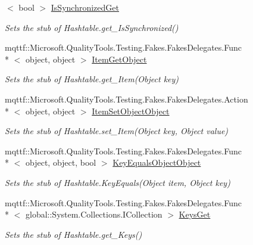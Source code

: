 \begin{DoxyCompactItemize}
$<$ bool $>$ \hyperlink{class_system_1_1_configuration_1_1_fakes_1_1_stub_settings_attribute_dictionary_a6901c41081a9838488c18b4675c11649}{Is\-Synchronized\-Get}
\begin{DoxyCompactList}\small\item\em Sets the stub of Hashtable.\-get\-\_\-\-Is\-Synchronized()\end{DoxyCompactList}\item 
mqttf\-::\-Microsoft.\-Quality\-Tools.\-Testing.\-Fakes.\-Fakes\-Delegates.\-Func\\*
$<$ object, object $>$ \hyperlink{class_system_1_1_configuration_1_1_fakes_1_1_stub_settings_attribute_dictionary_ad3d4d1179f9c27bd5b2f870a23fe1d64}{Item\-Get\-Object}
\begin{DoxyCompactList}\small\item\em Sets the stub of Hashtable.\-get\-\_\-\-Item(\-Object key)\end{DoxyCompactList}\item 
mqttf\-::\-Microsoft.\-Quality\-Tools.\-Testing.\-Fakes.\-Fakes\-Delegates.\-Action\\*
$<$ object, object $>$ \hyperlink{class_system_1_1_configuration_1_1_fakes_1_1_stub_settings_attribute_dictionary_a82cb99935a5c5d1f4e6e6943dd19197a}{Item\-Set\-Object\-Object}
\begin{DoxyCompactList}\small\item\em Sets the stub of Hashtable.\-set\-\_\-\-Item(\-Object key, Object value)\end{DoxyCompactList}\item 
mqttf\-::\-Microsoft.\-Quality\-Tools.\-Testing.\-Fakes.\-Fakes\-Delegates.\-Func\\*
$<$ object, object, bool $>$ \hyperlink{class_system_1_1_configuration_1_1_fakes_1_1_stub_settings_attribute_dictionary_af0339dc7fa0ffc87851718afcca750a7}{Key\-Equals\-Object\-Object}
\begin{DoxyCompactList}\small\item\em Sets the stub of Hashtable.\-Key\-Equals(\-Object item, Object key)\end{DoxyCompactList}\item 
mqttf\-::\-Microsoft.\-Quality\-Tools.\-Testing.\-Fakes.\-Fakes\-Delegates.\-Func\\*
$<$ global\-::\-System.\-Collections.\-I\-Collection $>$ \hyperlink{class_system_1_1_configuration_1_1_fakes_1_1_stub_settings_attribute_dictionary_a39b5141ae1e247f1da86ef6671b26a60}{Keys\-Get}
\begin{DoxyCompactList}\small\item\em Sets the stub of Hashtable.\-get\-\_\-\-Keys()\end{DoxyCompactList}\item 

\end{DoxyCompactItemize}
